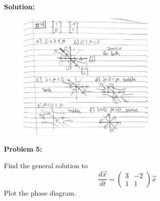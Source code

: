 \documentclass[12pt]{article}
\newenvironment{problem}[1]{
    \textbf{Problem #1:}
}{
    \rmfamily \vspace{1em}
}
\newenvironment{solution}{
    \textbf{Solution:}
    
}{
    
    \vspace{2em}
}
\begin{document}
\begin{solution}
    \begin{figure}[H]
        \centering
        \includegraphics[width=0.6\textwidth]{4.pdf}
    \end{figure}
\end{solution}

\newpage

\begin{problem}{5}
    Find the general solution to
    \[
        \frac{d\vec{x}}{dt} = \begin{pmatrix} 3 & -2 \\ 1 & 1 \end{pmatrix}\vec{x}
    \]
    Plot the phase diagram.
\end{problem}
\end{document}
